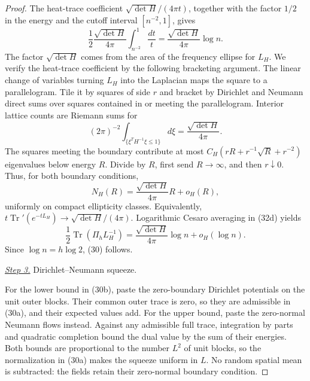 \documentclass{smfart}
\theoremstyle{definition}
\newcommand{\1}{\mathbf 1}
\begin{document}
\begin{proof}
The heat-trace coefficient $\sqrt{\det H}/(4\pi t)$, together with
the factor $1/2$ in the energy and the cutoff interval $[n^{-2},1]$,
gives
\begin{equation*}
\frac12\frac{\sqrt{\det H}}{4\pi}
\int_{n^{-2}}^1\frac{dt}{t}
=\frac{\sqrt{\det H}}{4\pi}\log n.
\end{equation*}
The factor $\sqrt{\det H}$ comes from the area of the frequency
ellipse for $L_H$.  We verify the heat-trace coefficient by the
following bracketing argument.  The linear change of variables turning
$L_H$ into the
Laplacian maps the square to a parallelogram.  Tile it by squares of side
$r$ and bracket by Dirichlet and Neumann direct sums over squares
contained in or meeting the parallelogram.  Interior lattice counts are
Riemann sums for
\begin{equation*}
(2\pi)^{-2}\int_ {\{\xi^TH^{-1}\xi\leq1\}}d\xi
=\frac{\sqrt{\det H}}{4\pi}.
\end{equation*}
The squares meeting the boundary contribute at most
$C_ H(rR+r^{-1}\sqrt R+r^{-2})$ eigenvalues below energy $R$.
Divide by $R$, first send $R\to\infty$, and then $r\downarrow0$.
Thus, for both boundary conditions,
\begin{equation}
N_ H(R)=\frac{\sqrt{\det H}}{4\pi}R+o_ H(R),
\tag{32e}
\end{equation}
uniformly on compact ellipticity classes.  Equivalently,
$t\operatorname {Tr}'(e^{-tL_ H})\to\sqrt{\det H}/(4\pi)$.
Logarithmic Cesaro averaging in (32d) yields
\begin{equation}
\frac12\operatorname {Tr}(\Pi_ hL_ H^{-1})
=\frac{\sqrt{\det H}}{4\pi}\log n+o_ H(\log n).
\tag{32}
\end{equation}
Since $\log n=h\log2$, (30) follows.

\smallskip\noindent
\underline{\textit{Step 3.}} Dirichlet--Neumann squeeze.

For the lower bound in (30b), paste the zero-boundary Dirichlet
potentials on the unit outer blocks.  Their common outer trace is
zero, so they are admissible in (30a), and their expected values add.
For the upper bound, paste the zero-normal Neumann flows instead.
Against any admissible full trace, integration by parts and quadratic
completion bound the dual value by the sum of their energies.  Both
bounds are proportional to the number $L^2$ of unit blocks, so the
normalization in (30a) makes the squeeze uniform in $L$.  No random
spatial mean is subtracted: the fields retain their zero-normal
boundary condition.


\end{proof}
\end{document}
